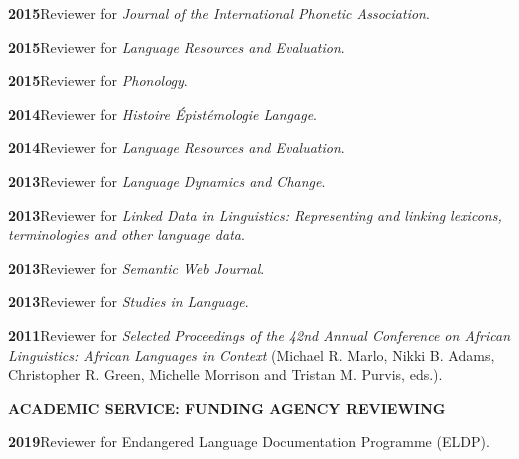 \documentclass[11pt]{article}
\newcommand{\hangpara}{
 \setlength{\parindent}{0in} %
 \hangindent=0.42in %
}
\begin{document}
\vskip 6pt
\hangpara
{\bf 2015}\hspace{1ex}Reviewer for \textit{Journal of the International Phonetic Association}.


\vskip 6pt
\hangpara
{\bf 2015}\hspace{1ex}Reviewer for \textit{Language Resources and Evaluation}.

\vskip 6pt
\hangpara
{\bf 2015}\hspace{1ex}Reviewer for \textit{Phonology}.

\vskip 6pt
\hangpara
{\bf 2014}\hspace{1ex}Reviewer for \textit{Histoire {\'E}pist{\'e}mologie Langage}.

\vskip 6pt
\hangpara
{\bf 2014}\hspace{1ex}Reviewer for \textit{Language Resources and Evaluation}.

\vskip 6pt
\hangpara
{\bf 2013}\hspace{1ex}Reviewer for \textit{Language Dynamics and Change}.

\vskip 6pt
\hangpara
{\bf 2013}\hspace{1ex}Reviewer for \textit{Linked Data in Linguistics: Representing and linking lexicons, terminologies and other language data}.

\vskip 6pt
\hangpara
{\bf 2013}\hspace{1ex}Reviewer for \textit{Semantic Web Journal}.

\vskip 6pt
\hangpara
{\bf 2013}\hspace{1ex}Reviewer for \textit{Studies in Language}.

\vskip 6pt
\hangpara
{\bf 2011}\hspace{1ex}Reviewer for \textit{Selected Proceedings of the 42nd Annual Conference on African Linguistics: African Languages in Context} (Michael R. Marlo, Nikki B. Adams, Christopher R. Green, Michelle Morrison and Tristan M. Purvis, eds.).


\vskip 20pt
\begin{flushleft}
{\bf ACADEMIC SERVICE: FUNDING AGENCY REVIEWING}
\end{flushleft}

\hangpara
{\bf 2019}\hspace{1ex}Reviewer for Endangered Language Documentation Programme (ELDP).
\end{document}
